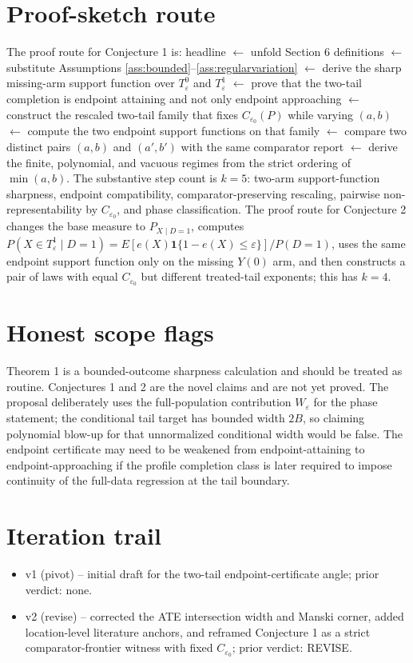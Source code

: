 \documentclass[11pt]{article}
\theoremstyle{definition}
\theoremstyle{plain}
\theoremstyle{remark}
\begin{document}
\section{Proof-sketch route}
The proof route for Conjecture 1 is:
headline \(\leftarrow\) unfold Section 6 definitions \(\leftarrow\) substitute
Assumptions \ref{ass:bounded}--\ref{ass:regularvariation} \(\leftarrow\)
derive the sharp missing-arm support function over \(T_\varepsilon^0\) and
\(T_\varepsilon^1\) \(\leftarrow\) prove that the two-tail completion is endpoint
attaining and not only endpoint approaching \(\leftarrow\) construct the rescaled
two-tail family that fixes \(C_{\varepsilon_0}(P)\) while varying \((a,b)\)
\(\leftarrow\) compute the two endpoint support functions on that family
\(\leftarrow\) compare two distinct pairs \((a,b)\) and \((a',b')\) with the same
comparator report \(\leftarrow\) derive the finite, polynomial, and vacuous regimes from
the strict ordering of \(\min(a,b)\). The substantive step count is \(k=5\):
two-arm support-function sharpness, endpoint compatibility, comparator-preserving
rescaling, pairwise non-representability by \(C_{\varepsilon_0}\), and phase
classification. The proof route for Conjecture 2 changes the base measure to
\(P_{X\mid D=1}\), computes
\(P(X\in T_\varepsilon^1\mid D=1)=E[e(X)\mathbf 1\{1-e(X)\leq\varepsilon\}]/P(D=1)\),
uses the same endpoint support function only on the missing \(Y(0)\) arm, and then
constructs a pair of laws with equal \(C_{\varepsilon_0}\) but different treated-tail
exponents; this has \(k=4\).

\section{Honest scope flags}
Theorem 1 is a bounded-outcome sharpness calculation and should be treated as routine.
Conjectures 1 and 2 are the novel claims and are not yet proved. The proposal deliberately
uses the full-population contribution \(W_\varepsilon\) for the phase statement; the
conditional tail target has bounded width \(2B\), so claiming polynomial blow-up for that
unnormalized conditional width would be false. The endpoint certificate may need to
be weakened from endpoint-attaining to endpoint-approaching if the profile completion
class is later required to impose continuity of the full-data regression at the tail
boundary.

\section{Iteration trail}
\begin{itemize}[leftmargin=*]
\item v1 (pivot) -- initial draft for the two-tail endpoint-certificate angle; prior verdict: none.
\item v2 (revise) -- corrected the ATE intersection width and Manski corner, added location-level literature anchors, and reframed Conjecture 1 as a strict comparator-frontier witness with fixed \(C_{\varepsilon_0}\); prior verdict: REVISE.
\end{itemize}
\end{document}
